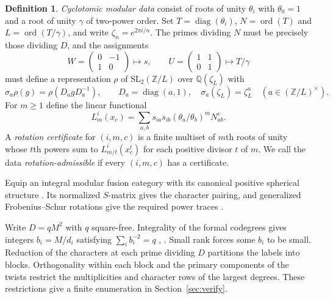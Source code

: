 \documentclass[11pt]{amsart}
\numberwithin{equation}{section}
\theoremstyle{definition}
\newtheorem{definition}[theorem]{Definition}
\theoremstyle{plain}
\newcommand{\QQ}{\mathbb Q}
\newcommand{\ZZ}{\mathbb Z}
\begin{document}
\begin{definition}\label{alg:mod-data}
\emph{Cyclotomic modular data} consist of roots of unity $\theta_i$
with $\theta_0=1$ and a root of unity $\gamma$ of two-power order.
Set $T=\operatorname{diag}(\theta_i)$,
$N=\operatorname{ord}(T)$ and $L=\operatorname{ord}(T/\gamma)$, and write $\zeta_n=e^{2\pi i/n}$.
The primes dividing $N$ must be precisely those dividing $D$, and
the assignments
\[
 W=\left(\begin{smallmatrix}0&-1\\1&0\end{smallmatrix}\right)
 \longmapsto s,\qquad
 U=\left(\begin{smallmatrix}1&1\\0&1\end{smallmatrix}\right)
 \longmapsto T/\gamma
\]
must define a representation $\rho$ of $\mathrm{SL}_2(\ZZ/L)$ over
$\QQ(\zeta_L)$ with
\begin{equation}\label{alg:covariance}
 \sigma_a\rho(g)=\rho(D_a gD_a^{-1}),\qquad
 D_a=\operatorname{diag}(a,1),\quad \sigma_a(\zeta_L)=\zeta_L^a
 \quad (a\in(\ZZ/L)^\times).
\end{equation}
For $m\ge1$ define the linear functional
\begin{equation}\label{alg:rotation}
 L_m^i(x_c)=\sum_{a,b}s_{ia}s_{ib}(\theta_a/\theta_b)^m N_{ab}^c .
\end{equation}
A \emph{rotation certificate} for $(i,m,c)$ is a finite multiset
of $m$th roots of unity whose $t$th powers sum to $L_{m/t}^i(x_c^t)$
for each positive divisor $t$ of $m$. We call the data
\emph{rotation-admissible} if every $(i,m,c)$ has a certificate.
\end{definition}

Equip an integral modular fusion category with its canonical positive spherical structure \cite[Propositions~8.23--8.24]{ENOannals}. Its normalized $S$-matrix gives the character pairing, and generalized Frobenius--Schur rotations give the required power traces \cite{DLNCongruence,NSind}.

Write $D=qM^2$ with $q$ square-free. Integrality of the formal codegrees gives integers $b_i=M/d_i$ satisfying $\sum_i b_i^{-2}=q$ \cite[Lemma~2.3]{HR}, \cite[\S4]{ABPP}. Small rank forces some $b_i$ to be small. Reduction of the characters at each prime dividing $D$ partitions the labels into blocks. Orthogonality within each block and the primary components of the twists restrict the multiplicities and character rows of the largest degrees. These restrictions give a finite enumeration in Section~\ref{sec:verify}.
\end{document}
